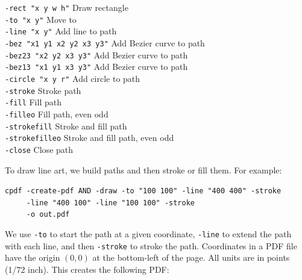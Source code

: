 \documentclass{book}
\begin{document}
  {\small\begin{framed}
   \noindent\verb!-rect "x y w h"! Draw rectangle\\
   \noindent\verb!-to "x y"! Move to\\
   \noindent\verb!-line "x y"! Add line to path\\
   \noindent\verb!-bez "x1 y1 x2 y2 x3 y3"! Add Bezier curve to path\\
   \noindent\verb!-bez23 "x2 y2 x3 y3"! Add Bezier curve to path\\
   \noindent\verb!-bez13 "x1 y1 x3 y3"! Add Bezier curve to path\\
   \noindent\verb!-circle "x y r"! Add circle to path\\
   \noindent\verb!-stroke! Stroke path\\
   \noindent\verb!-fill! Fill path\\
   \noindent\verb!-filleo! Fill path, even odd\\
   \noindent\verb!-strokefill! Stroke and fill path\\
   \noindent\verb!-strokefilleo! Stroke and fill path, even odd\\
   \noindent\verb!-close! Close path
  \end{framed}}

\noindent  To draw line art, we build paths and then stroke or fill them. For example:

\begin{framed}
 \noindent\small\verb?cpdf -create-pdf AND -draw -to "100 100" -line "400 400" -stroke?\\
 \noindent\small\verb?     -line "400 100" -line "100 100" -stroke?\\
 \noindent\small\verb?     -o out.pdf?
\end{framed}

\noindent We use \texttt{-to} to start the path at a given coordinate, \texttt{-line} to extend the path with each line, and then \texttt{-stroke} to stroke the path. Coordinates in a PDF file have the origin $(0, 0)$ at the bottom-left of the page. All units are in points (1/72 inch). This creates the following PDF:

\bigskip
{}
\bigskip
\end{document}
